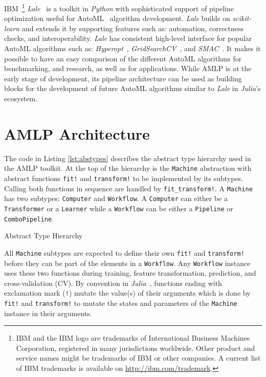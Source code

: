\documentclass{juliacon}
\begin{document}
IBM~\footnote{IBM and the IBM logo are trademarks of International Business Machines Corporation, registered in many jurisdictions worldwide. Other product and service names might be trademarks of IBM or other companies. A current list of IBM trademarks is available on \url{http://ibm.com/trademark}.} \emph{Lale}~\cite{lale} is a toolkit in \emph{Python} with sophisticated
support of pipeline optimization useful for AutoML~\cite{Liu:AAAI2020}
algorithm development.  \emph{Lale} builds on \emph{scikit-learn} and
extends it by supporting features such as: automation, correctness checks, and
interoperability.  \emph{Lale} has consistent high-level interface for popular
AutoML algorithms such as:
\emph{Hyperopt}~\cite{bergstra2011nips,bergstra2012},
\emph{GridSearchCV}~\cite{pedregosa2011}, and
\emph{SMAC}~\cite{hutter2011smac}.  It makes it possible to have an
easy comparison of the different AutoML algorithms for benchmarking, and research,
as well as for applications. While AMLP is at the early stage of development, its
pipeline architecture can be used as building blocks for the development of
future AutoML algorithms similar to \emph{Lale} in \emph{Julia}'s
ecosystem.

\section{AMLP Architecture}
\label{amlparchitecture}

The code in Listing \ref{lst:abstypes} describes the abstract type hierarchy
used in the AMLP toolkit. At the top of the hierarchy is the \texttt{Machine}
abstraction with abstract functions \texttt{fit!} and \texttt{transform!} to be
implemented by its subtypes. Calling both functions in sequence are handled by
\texttt{fit\_transform!}.  A \texttt{Machine} has two subtypes:
\texttt{Computer} and \texttt{Workflow}.  A \texttt{Computer} can either be a
\texttt{Transformer} or a \texttt{Learner} while a \texttt{Workflow} can be
either a \texttt{Pipeline} or  \texttt{ComboPipeline}.

\begin{lstfloat}[htbp]
  
  \caption{Abstract Type Hierarchy}
  \label{lst:abstypes}
\end{lstfloat}

\vskip 6pt

All \texttt{Machine} subtypes are expected to define their own \texttt{fit!}
and \texttt{transform!}  before they can be part of the elements in a
\texttt{Workflow}. Any \texttt{Workflow} instance uses these two functions
during training, feature transformation, prediction,
and cross-validation (CV). By
convention in \emph{Julia}~\cite{bezanson2017julia}, functions ending
with exclamation mark (\texttt{!}) mutate the value(s) of their arguments which
is done by \texttt{fit!} and \texttt{transform!}
to mutate the states and parameters of the
\texttt{Machine} instance in their arguments.
\end{document}
